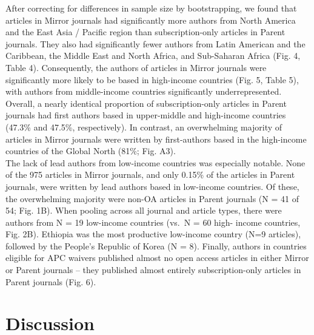 \documentclass[
  english,
  man]{apa6}
\begin{document}
After correcting for differences in sample size by bootstrapping, we found that articles in Mirror journals had significantly more authors from North America and the East Asia / Pacific region than subscription-only articles in Parent journals. They also had significantly fewer authors from Latin American and the Caribbean, the Middle East and North Africa, and Sub-Saharan Africa (Fig. 4, Table 4). Consequently, the authors of articles in Mirror journals were significantly more likely to be based in high-income countries (Fig. 5, Table 5), with authors from middle-income countries significantly underrepresented. Overall, a nearly identical proportion of subscription-only articles in Parent journals had first authors based in upper-middle and high-income countries (47.3\% and 47.5\%, respectively). In contrast, an overwhelming majority of articles in Mirror journals were written by first-authors based in the high-income countries of the Global North (81\%; Fig. A3).\\
The lack of lead authors from low-income countries was especially notable. None of the 975 articles in Mirror journals, and only 0.15\% of the articles in Parent journals, were written by lead authors based in low-income countries. Of these, the overwhelming majority were non-OA articles in Parent journals (N = 41 of 54; Fig. 1B). When pooling across all journal and article types, there were authors from N = 19 low-income countries (vs.~N = 60 high- income countries, Fig. 2B). Ethiopia was the most productive low-income country (N=9 articles), followed by the People's Republic of Korea (N = 8). Finally, authors in countries eligible for APC waivers published almost no open access articles in either Mirror or Parent journals -- they published almost entirely subscription-only articles in Parent journals (Fig. 6).\\

\hypertarget{discussion}{%
\section{Discussion}\label{discussion}}
\end{document}
